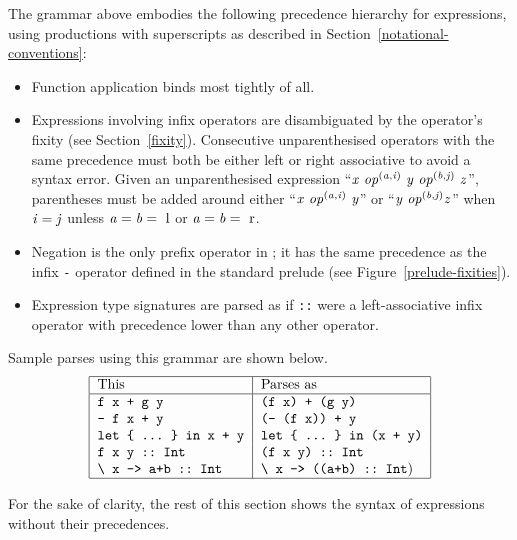 The grammar above embodies the following precedence hierarchy for
expressions, using productions with superscripts as described in
Section~\ref{notational-conventions}:
\begin{itemize}
\item
Function application binds most tightly of all.
\item
Expressions involving infix operators are disambiguated by the
operator's fixity (see Section~\ref{fixity}).
Consecutive unparenthesised operators with the same
precedence must both be either left or right associative
to avoid a syntax error.
Given an unparenthesised expression ``\mbox{$\it x\ op^{(a,i)}\ y\ op^{(b,j)}\ z$}'', parentheses
must be added around either ``\mbox{$\it x\ op^{(a,i)}\ y$}'' or ``\mbox{$\it y\ op^{(b,j)}\\
\it z$}'' when \mbox{$\it i=j$} unless \mbox{$\it a=b={\rm\ l}$} or \mbox{$\it a=b={\rm\ r}$}.
\item
Negation is the only prefix operator in
\Haskell{}; it has the same precedence as the infix \mbox{\tt -} operator
defined in the standard prelude (see Figure~\ref{prelude-fixities}).
\item
Expression type signatures are parsed as if \mbox{\tt ::} were a
left-associative infix operator with precedence lower than any other
operator.
\end{itemize}
Sample parses using this grammar are shown below.
\[\bt{|l|l|}\hline
This                                & Parses as                             \\
\hline
\mbox{\tt f\ x\ +\ g\ y}                         & \mbox{\tt (f\ x)\ +\ (g\ y)}                       \\
\mbox{\tt -\ f\ x\ +\ y}                         & \mbox{\tt (-\ (f\ x))\ +\ y}                       \\
\mbox{\tt let\ {\char'173}\ ...\ {\char'175}\ in\ x\ +\ y}              & \mbox{\tt let\ {\char'173}\ ...\ {\char'175}\ in\ (x\ +\ y)}              \\
\mbox{\tt f\ x\ y\ ::\ Int}                      & \mbox{\tt (f\ x\ y)\ ::\ Int}                      \\
\mbox{\tt {\char'134}\ x\ ->\ a+b\ ::\ Int}                 & \mbox{\tt {\char'134}\ x\ ->\ ((a+b)\ ::\ Int})               \\
\hline\et\]

For the sake of clarity, the rest of this section shows the syntax of
expressions without their precedences.

